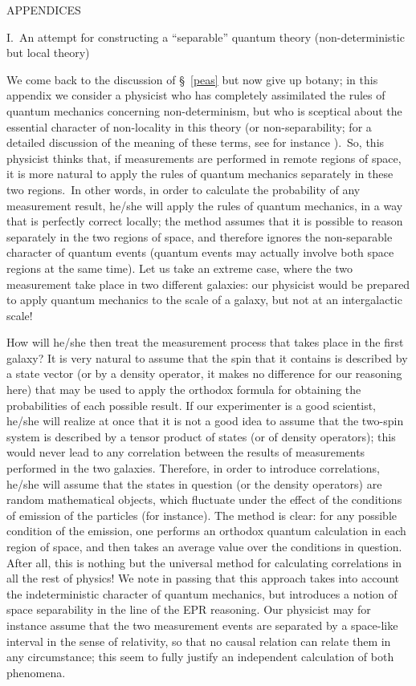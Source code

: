 \documentclass[12pt,onecolumn]{article}%
\begin{document}
\bigskip

\begin{center}
APPENDICES \bigskip\bigskip

I.\ An attempt for constructing a ``separable'' quantum theory
(non-deterministic but local theory)
\end{center}

We come back to the discussion of \S \ \ref{peas} but now give up botany; in
this appendix we consider a physicist who has completely assimilated the rules
of quantum mechanics concerning non-determinism, but who is sceptical about
the essential character of non-locality in this theory (or non-separability;
for a detailed discussion of the meaning of these terms, see for instance
\cite{d'Espagnat} \cite{Bell-speakable}).\ So, this physicist thinks that, if
measurements are performed in remote regions of space, it is more natural to
apply the rules of quantum mechanics separately in these two regions.\ In
other words, in order to calculate the probability of any measurement result,
he/she will apply the rules of quantum mechanics, in a way that is perfectly
correct locally; the method assumes that it is possible to reason separately
in the two regions of space, and therefore ignores the non-separable character
of quantum events (quantum events may actually involve both space regions at
the same time). Let us take an extreme case, where the two measurement take
place in two different galaxies: our physicist would be prepared to apply
quantum mechanics to the scale of a galaxy, but not at an intergalactic scale!

How will he/she then treat the measurement process that takes place in the
first galaxy? It is very natural to assume that the spin that it contains is
described by a state vector (or by a density operator, it makes no difference
for our reasoning here) that may be used to apply the orthodox formula for
obtaining the probabilities of each possible result. If our experimenter is a
good scientist, he/she will realize at once that it is not a good idea to
assume that the two-spin system is described by a tensor product of states (or
of density operators); this would never lead to any correlation between the
results of measurements performed in the two galaxies. Therefore, in order to
introduce correlations, he/she will assume that the states in question (or the
density operators) are random mathematical objects, which fluctuate under the
effect of the conditions of emission of the particles (for instance). The
method is clear: for any possible condition of the emission, one performs an
orthodox quantum calculation in each region of space, and then takes an
average value over the conditions in question. After all, this is nothing but
the universal method for calculating correlations in all the rest of physics!
We note in passing that this approach takes into account the indeterministic
character of quantum mechanics, but introduces a notion of space separability
in the line of the EPR reasoning. Our physicist may for instance assume that
the two measurement events are separated by a space-like interval in the sense
of relativity, so that no causal relation can relate them in any circumstance;
this seem to fully justify an independent calculation of both phenomena.
\end{document}
